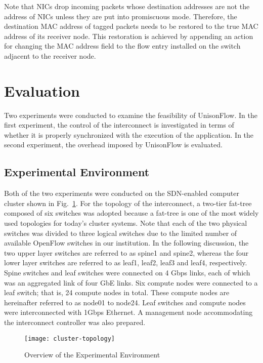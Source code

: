 Note that NICs drop incoming packets whose destination addresses are not
the address of NICs unless they are put into promiscuous mode.
Therefore, the destination MAC address of tagged packets needs to be
restored to the true MAC address of its receiver node. This restoration
is achieved by appending an action for changing the MAC address field to
the flow entry installed on the switch adjacent to the receiver node.

\section{Evaluation}\label{sec:iv-evaluation}

Two experiments were conducted to examine the feasibility of UnisonFlow.
In the first experiment, the control of the interconnect is investigated
in terms of whether it is properly synchronized with the execution of
the application. In the second experiment, the overhead imposed by
UnisonFlow is evaluated.

\subsection{Experimental Environment}

Both of the two experiments were conducted on the SDN-enabled computer
cluster shown in Fig.~\ref{fig:cluster-topology}. For the topology of
the interconnect, a two-tier fat-tree composed of six switches was
adopted because a fat-tree is one of the most widely used topologies for
today's cluster systems. Note that each of the two physical switches was
divided to three logical switches due to the limited number of available
OpenFlow switches in our institution. In the following discussion,
the two upper layer switches are referred to as spine1 and spine2, whereas the
four lower layer switches are referred to as leaf1, leaf2, leaf3 and
leaf4, respectively. Spine switches and leaf switches were connected on
4 Gbps links, each of which was an aggregated link of four GbE links.
Six compute nodes were connected to a leaf switch; that is, 24
compute nodes in total. These compute nodes are hereinafter referred
to as node01 to node24. Leaf switches and compute nodes were
interconnected with 1Gbps Ethernet. A management node accommodating the
interconnect controller was also prepared.

\begin{figure}
    \centering
    \texttt{[image: cluster-topology]}
    \caption{Overview of the Experimental Environment}%
    \label{fig:cluster-topology}
\end{figure}

